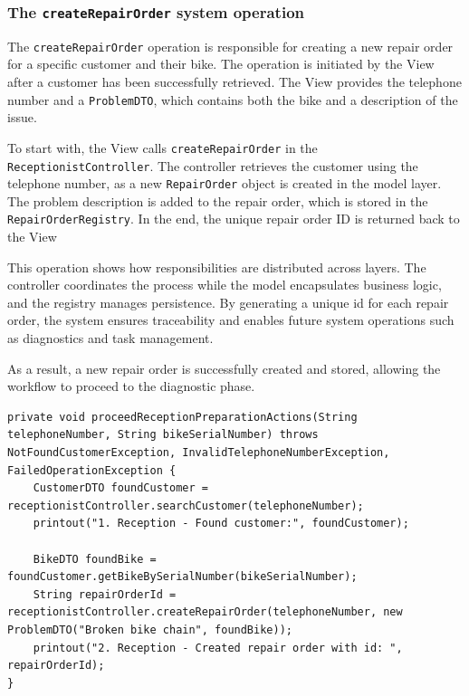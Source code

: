 \documentclass[a4paper]{scrartcl}
\begin{document}
\subsubsection{The \texttt{createRepairOrder} system operation}

The \texttt{createRepairOrder} operation is responsible for creating a new repair order for a specific customer and their bike. The operation is initiated by the View after a customer has been successfully retrieved. The View provides the telephone number and a \texttt{ProblemDTO}, which contains both the bike and a description of the issue.

To start with, the View calls \texttt{createRepairOrder} in the \texttt{ReceptionistController}. The controller retrieves the customer using the telephone number, as a new \texttt{RepairOrder} object is created in the model layer. The problem description is added to the repair order, which is stored in the \texttt{RepairOrderRegistry}. In the end, the unique repair order ID is returned back to the View

This operation shows how responsibilities are distributed across layers. The controller coordinates the process while the model encapsulates business logic, and the registry manages persistence. By generating a unique id for each repair order, the system ensures traceability and enables future system operations such as diagnostics and task management.

As a result, a new repair order is successfully created and stored, allowing the workflow to proceed to the diagnostic phase.

\begin{lstlisting}[style=javastyle, caption={Method \texttt{proceedReceptionPreparationActions} in \texttt{View} for proceeding receptionist preparation tasks}]
private void proceedReceptionPreparationActions(String telephoneNumber, String bikeSerialNumber) throws NotFoundCustomerException, InvalidTelephoneNumberException, FailedOperationException {
    CustomerDTO foundCustomer = receptionistController.searchCustomer(telephoneNumber);
    printout("1. Reception - Found customer:", foundCustomer);

    BikeDTO foundBike = foundCustomer.getBikeBySerialNumber(bikeSerialNumber);
    String repairOrderId = receptionistController.createRepairOrder(telephoneNumber, new ProblemDTO("Broken bike chain", foundBike));
    printout("2. Reception - Created repair order with id: ", repairOrderId);
}
\end{lstlisting}
\end{document}
